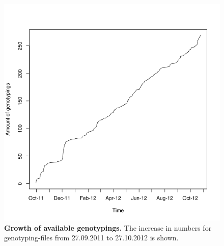 \documentclass[10pt]{article}
\begin{document}
\begin{figure}[!ht]
	\begin{center}
		\includegraphics[scale=0.35]{25_10_2012_Graphs/genotypes.tif}
	\end{center}
	\caption{
	{\bf Growth of available genotypings.} The increase in numbers for genotyping-files from 27.09.2011 to 27.10.2012 is shown.} 
	\label{Figure2_label}
\end{figure}
\end{document}

